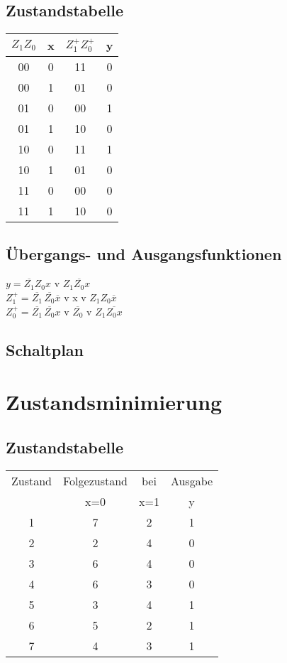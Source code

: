 \documentclass[ngerman,12pt,parskip=half]{scrartcl}
\begin{document}
\subsection{Zustandstabelle}

\begin{tabular}{cccc}  
	$Z_{1}Z_{0}$& x & $Z^+_{1}Z^+_{0}$ & y \\ \hline	
	00 & 0 & 11 & 0  \\ 
	00 & 1 & 01 & 0 \\ \hline
	01 & 0 & 00 & 1 \\
	01 & 1 & 10 & 0 \\ \hline
	10 & 0 & 11 & 1 \\
	10 & 1 & 01 & 0 \\ \hline
	11 & 0 & 00 & 0 \\
	11 & 1 & 10 & 0 \\
\end{tabular}
\vspace{0,5 cm}

\subsection{Übergangs- und Ausgangsfunktionen}

$y=\overline{Z_{1}}Z_{0}x$ v $Z_{1}\overline{Z_{0}}x$ \\
$Z^+_{1}= \overline{Z_{1}}\,\overline{Z_{0}}\overline{x}$ v x v $Z_{1}Z_0\overline{x}$ \\
$Z^+_{0}=\overline{Z_{1}}\,\overline{Z_{0}}x$ v $\overline{Z_{0}}$ v $Z_{1}\overline{Z_{0}x}$

\subsection{Schaltplan}

\begin{center}
	
\end{center}

\clearpage

\section{Zustandsminimierung} 

\subsection{Zustandstabelle}

\begin{tabular}{c|cc|c}  
	Zustand & Folgezustand & bei & Ausgabe \\ 	
	   & x=0 & x=1 & y  \\ \hline
	1 & 7 & 2 & 1 \\ 
	2 & 2 & 4 & 0 \\
	3 & 6 & 4 & 0 \\ 
	4 & 6 & 3 & 0 \\
	5 & 3 & 4 & 1 \\ 
	6 & 5 & 2 & 1 \\
	7 & 4 & 3 & 1 \\
\end{tabular}
\end{document}
